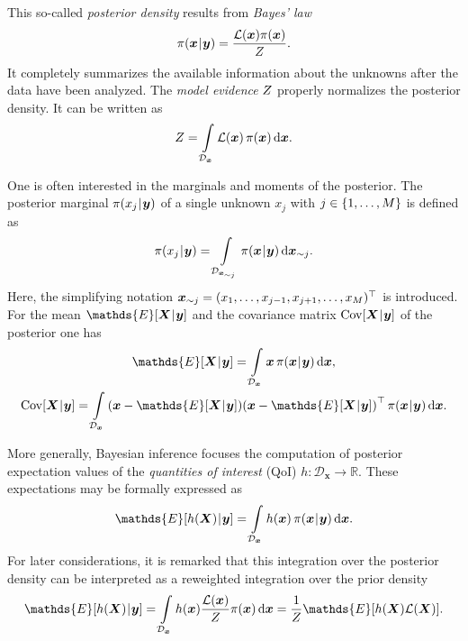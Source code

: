 This so-called \emph{posterior density} results from \emph{Bayes' law}
\begin{equation} \label{eq:JCP:Bayesian:Posterior}
  \pi(\bm{x} {\:\!}|{\:\!} \bm{y}) = \frac{\mathcal{L}(\bm{x}) \pi(\bm{x})}{Z}.
\end{equation}
It completely summarizes the available information about the unknowns after the data have been analyzed.
The \emph{model evidence} \(Z\) properly normalizes the posterior density.
It can be written as
\begin{equation} \label{eq:JCP:Bayesian:ScaleFactor}
  Z = \int\limits_{\mathcal{D}_{\bm{x}}} \mathcal{L}(\bm{x}) \, \pi(\bm{x}) \, \mathrm{d} \bm{x}.
\end{equation}
\par %
One is often interested in the marginals and moments of the posterior.
The posterior marginal \(\pi(x_j {\:\!}|{\:\!} \bm{y})\) of a single unknown \(x_j\) with \(j \in \{1,\ldots,M\}\) is defined as
\begin{equation} \label{eq:JCP:Bayesian:Marginal1D}
  \pi(x_j {\:\!}|{\:\!} \bm{y}) = \int\limits_{\mathcal{D}_{\bm{x}_{\sim j}}} \pi(\bm{x} {\:\!}|{\:\!} \bm{y}) \, \mathrm{d} \bm{x}_{\sim j}.
\end{equation}
Here, the simplifying notation \(\bm{x}_{\sim j} = (x_1,\ldots,x_{j-1},x_{j+1},\ldots,x_M)^\top\) is introduced.
For the mean \(\mathds{E}[\bm{X} \cond \bm{y}]\) and the covariance matrix \(\mathrm{Cov}[\bm{X} {\:\!}|{\:\!} \bm{y}]\) of the posterior one has
\begin{gather}
  \mathds{E}[\bm{X} \cond \bm{y}] = \int\limits_{\mathcal{D}_{\bm{x}}} \bm{x} \, \pi(\bm{x} \cond \bm{y}) \, \mathrm{d} \bm{x}, \label{eq:JCP:Bayesian:PosteriorMean} \\
  \mathrm{Cov}[\bm{X} \cond \bm{y}] = \int\limits_{\mathcal{D}_{\bm{x}}} \left( \bm{x} - \mathds{E}[\bm{X} \cond \bm{y}]) (\bm{x} - \mathds{E}[\bm{X} \cond \bm{y}] \right)^\top
  \pi(\bm{x} \cond \bm{y}) \, \mathrm{d} \bm{x}. \label{eq:JCP:Bayesian:PosteriorCovariance}
\end{gather}
\par %
More generally, Bayesian inference focuses the computation of posterior expectation values of the \emph{quantities of interest} (QoI) \(h \colon \mathcal{D}_{\bm{x}} \rightarrow \mathds{R}\).
These expectations may be formally expressed as
\begin{equation} \label{eq:JCP:Bayesian:QoI}
  \mathds{E}[h(\bm{X}) \cond \bm{y}] = \int\limits_{\mathcal{D}_{\bm{x}}} h(\bm{x}) \, \pi(\bm{x} \cond \bm{y}) \, \mathrm{d} \bm{x}.
\end{equation}
For later considerations, it is remarked that this integration over the posterior density can be interpreted as a reweighted integration over the prior density
\begin{equation} \label{eq:JCP:Baysian:KeyIdentity}
  \mathds{E}[h(\bm{X}) \cond \bm{y}]
  = \int\limits_{\mathcal{D}_{\bm{x}}} h(\bm{x}) \frac{\mathcal{L}(\bm{x})}{\scale} \pi(\bm{x}) \, \mathrm{d} \bm{x}
  = \frac{1}{\scale} \mathds{E}[h(\bm{X}) \mathcal{L}(\bm{X})].
\end{equation}

